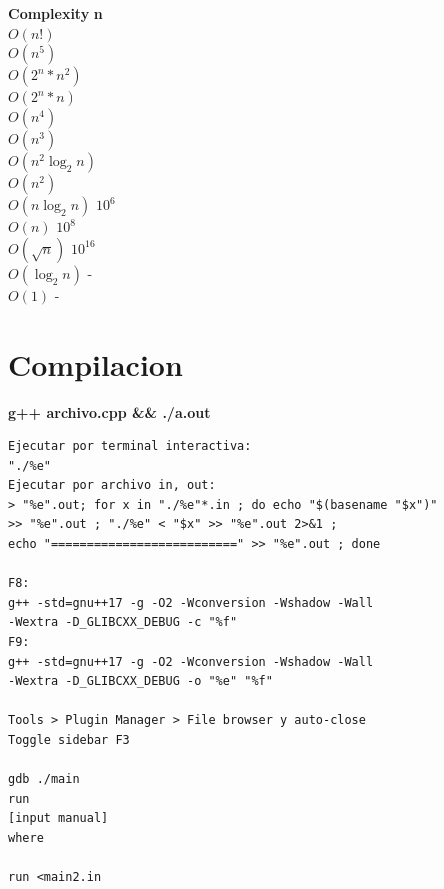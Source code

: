\begin{tabbing}
\textbf{Complexity}\hspace{4cm} \=  \textbf{n}\hspace{3cm}   \\ 
$O(n!)$ \\ 
$O(n^{5})$ \\ 
$O(2^{n}*n^{2})$ \\ 
$O(2^{n}*n)$ \\ 
$O(n^{4})$ \\ 
$O(n^{3})$ \\ 
$O(n^{2}\log_{2}n)$ \\ 
$O(n^{2})$ \\ 
$O(n\log_{2}n)$ \> $10^{6}$\\ 
$O(n)$ \> $10^{8}$\\ 
$O(\sqrt{n})$ \> $10^{16}$\\ 
$O(\log_{2}n)$ \> -\\ 
$O(1)$ \> -\\ 
\end{tabbing}

\section{Compilacion}
\textbf{g++ archivo.cpp \&\& ./a.out}

\begin{verbatim}
Ejecutar por terminal interactiva:
"./%e"
Ejecutar por archivo in, out:
> "%e".out; for x in "./%e"*.in ; do echo "$(basename "$x")" 
>> "%e".out ; "./%e" < "$x" >> "%e".out 2>&1 ;
echo "==========================" >> "%e".out ; done

F8:
g++ -std=gnu++17 -g -O2 -Wconversion -Wshadow -Wall
-Wextra -D_GLIBCXX_DEBUG -c "%f"
F9:
g++ -std=gnu++17 -g -O2 -Wconversion -Wshadow -Wall
-Wextra -D_GLIBCXX_DEBUG -o "%e" "%f"

Tools > Plugin Manager > File browser y auto-close
Toggle sidebar F3

gdb ./main
run
[input manual]
where

run <main2.in
\end{verbatim}


